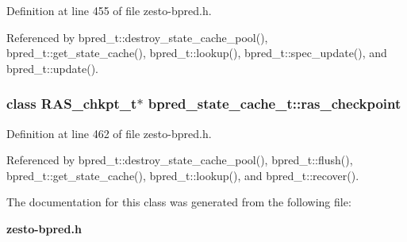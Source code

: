 Definition at line 455 of file zesto-bpred.h.

Referenced by bpred\_\-t::destroy\_\-state\_\-cache\_\-pool(), bpred\_\-t::get\_\-state\_\-cache(), bpred\_\-t::lookup(), bpred\_\-t::spec\_\-update(), and bpred\_\-t::update().
\subsubsection[{ras\_\-checkpoint}]{\setlength{\rightskip}{0pt plus 5cm}class {\bf RAS\_\-chkpt\_\-t}$\ast$ {\bf bpred\_\-state\_\-cache\_\-t::ras\_\-checkpoint}\hspace{0.3cm}{\tt  [protected]}}\label{classbpred__state__cache__t_2b62c64b1cd517768e59f9f17face06c}




Definition at line 462 of file zesto-bpred.h.

Referenced by bpred\_\-t::destroy\_\-state\_\-cache\_\-pool(), bpred\_\-t::flush(), bpred\_\-t::get\_\-state\_\-cache(), bpred\_\-t::lookup(), and bpred\_\-t::recover().

The documentation for this class was generated from the following file:\begin{CompactItemize}
\item 
{\bf zesto-bpred.h}\end{CompactItemize}
